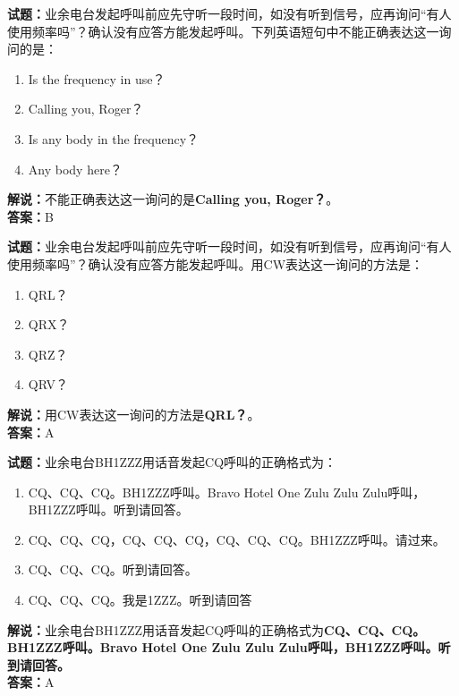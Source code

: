 \documentclass{ctexbook}
\begin{document}
\vspace{1em}

\textbf{试题：}业余电台发起呼叫前应先守听一段时间，如没有听到信号，应再询问“有人使用频率吗”？确认没有应答方能发起呼叫。下列英语短句中不能正确表达这一询问的是：
\begin{enumerate}[leftmargin=3em]
  \item Is the frequency in use？
  \item Calling you, Roger？%
  \item Is any body in the frequency？
  \item Any body here？
\end{enumerate}
\noindent\textbf{解说：}不能正确表达这一询问的是\textbf{Calling you, Roger？}。\\\noindent\textbf{答案：}B

\vspace{1em}

\textbf{试题：}业余电台发起呼叫前应先守听一段时间，如没有听到信号，应再询问“有人使用频率吗”？确认没有应答方能发起呼叫。用CW表达这一询问的方法是：
\begin{enumerate}[leftmargin=3em]
  \item QRL？
  \item QRX？
  \item QRZ？
  \item QRV？
\end{enumerate}
\noindent\textbf{解说：}用CW表达这一询问的方法是\textbf{QRL？}。\\\noindent\textbf{答案：}A

\vspace{1em}

\textbf{试题：}业余电台BH1ZZZ用话音发起CQ呼叫的正确格式为：
\begin{enumerate}[leftmargin=3em]
  \item CQ、CQ、CQ。BH1ZZZ呼叫。Bravo Hotel One Zulu Zulu Zulu呼叫，BH1ZZZ呼叫。听到请回答。
  \item CQ、CQ、CQ，CQ、CQ、CQ，CQ、CQ、CQ。BH1ZZZ呼叫。请过来。
  \item CQ、CQ、CQ。听到请回答。
  \item CQ、CQ、CQ。我是1ZZZ。听到请回答
\end{enumerate}
\noindent\textbf{解说：}业余电台BH1ZZZ用话音发起CQ呼叫的正确格式为\textbf{CQ、CQ、CQ。BH1ZZZ呼叫。Bravo Hotel One Zulu Zulu Zulu呼叫，BH1ZZZ呼叫。听到请回答。}\\\noindent\textbf{答案：}A
\end{document}
